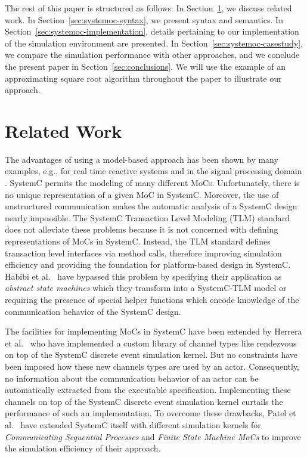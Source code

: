The rest of this paper is structured as follows:
In Section~\ref{sec:related-work}, we discuss related work.
In Section~\ref{sec:systemoc-syntax}, we present \SysteMoC{} syntax and semantics.
In Section~\ref{sec:systemoc-implementation}, details pertaining to our implementation of the \SysteMoC{} simulation environment are presented.
In Section~\ref{sec:systemoc-casestudy}, we compare the \SysteMoC{} simulation performance with other approaches,
and we conclude the present paper in Section~\ref{sec:conclusions}.
We will use the example of an approximating square root algorithm throughout the paper to illustrate our approach.

\chapter{Related Work}\label{sec:related-work}

The advantages of using a model-based approach has been shown by many examples, e.g., for real time reactive systems \cite{BFMV05} and in the signal processing domain \cite{bhattacharyya,bb:2000a}.
SystemC \cite{glms:2002,systemc-lrm:2003} permits the modeling of many different MoCs.
Unfortunately, there is no unique representation of a given MoC in SystemC.
Moreover, the use of unstructured communication makes the automatic analysis of a SystemC design nearly impossible.
The SystemC Transaction Level Modeling (TLM) standard \cite{SystemC-TLM05} does not alleviate these problems because it is not concerned with defining representations of MoCs in SystemC.
Instead, the TLM standard defines transaction level interfaces via method calls, therefore improving simulation efficiency and providing the foundation for platform-based design in SystemC.
Habibi et al.~\cite{HTSLM06, HMT06} have bypassed this problem by specifying their application as \emph{abstract state machines} which they transform into a SystemC-TLM model or requiring the presence of special helper functions which encode knowledge of the communication behavior of the SystemC design.

The facilities for implementing MoCs in SystemC have been extended by Herrera et al.~\cite{herrerasystemc:2004} who have implemented a custom library of channel types like rendezvous on top of the SystemC discrete event simulation kernel.
But no constraints have been imposed how these new channels types are used by an actor.
Consequently, no information about the communication behavior of an actor can be automatically extracted from the executable specification.
Implementing these channels on top of the SystemC discrete event simulation kernel curtails the performance of such an implementation.
To overcome these drawbacks, Patel et al.~\cite{PS:2005, PS:2004} have extended SystemC itself with different simulation kernels for \emph{Communicating Sequential Processes} and \emph{Finite State Machine MoCs} to improve the simulation efficiency of their approach.

